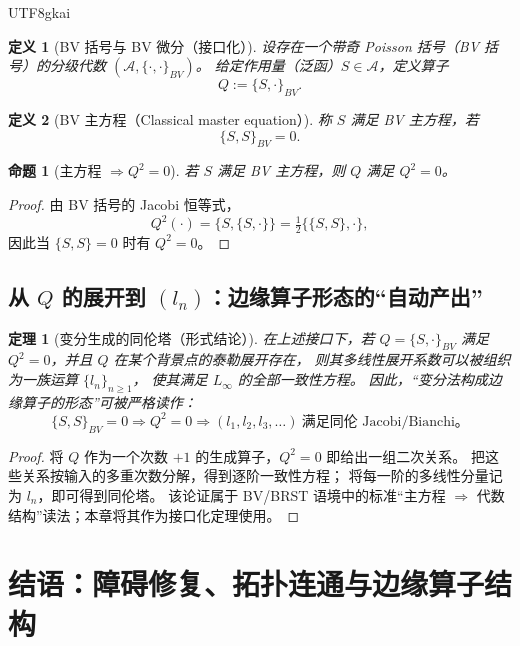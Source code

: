\documentclass[12pt]{article}
\newtheorem{definition}{定义}[section]
\newtheorem{theorem}{定理}[section]
\newtheorem{proposition}{命题}[section]
\begin{document}
\begin{CJK*}{UTF8}{gkai}
\begin{definition}[BV 括号与 BV 微分（接口化）]
设存在一个带奇 Poisson 括号（BV 括号）的分级代数 $(\mathcal{A},\{\cdot,\cdot\}_{BV})$。
给定作用量（泛函）$S\in\mathcal{A}$，定义算子
\[
  Q:=\{S,\cdot\}_{BV}.
\]
\end{definition}

\begin{definition}[BV 主方程（Classical master equation）]
称 $S$ 满足 BV 主方程，若
\[
  \{S,S\}_{BV}=0.
\]
\end{definition}

\begin{proposition}[主方程 $\Rightarrow Q^2=0$]
若 $S$ 满足 BV 主方程，则 $Q$ 满足 $Q^2=0$。
\end{proposition}

\begin{proof}
由 BV 括号的 Jacobi 恒等式，
\[
  Q^2(\cdot)=\{S,\{S,\cdot\}\}
  =\tfrac12\{\{S,S\},\cdot\},
\]
因此当 $\{S,S\}=0$ 时有 $Q^2=0$。
\end{proof}

\subsection{从 $Q$ 的展开到 $(l_n)$：边缘算子形态的“自动产出”}

\begin{theorem}[变分生成的同伦塔（形式结论）]
\label{thm:variational-generates-linfty}
在上述接口下，若 $Q=\{S,\cdot\}_{BV}$ 满足 $Q^2=0$，并且 $Q$ 在某个背景点的泰勒展开存在，
则其多线性展开系数可以被组织为一族运算 $\{l_n\}_{n\ge 1}$，
使其满足 $L_\infty$ 的全部一致性方程。
因此，“变分法构成边缘算子的形态”可被严格读作：
\[
  \{S,S\}_{BV}=0 \Longrightarrow Q^2=0 \Longrightarrow (l_1,l_2,l_3,\dots)\ \text{满足同伦 Jacobi/Bianchi。}
\]
\end{theorem}

\begin{proof}
将 $Q$ 作为一个次数 $+1$ 的生成算子，$Q^2=0$ 即给出一组二次关系。
把这些关系按输入的多重次数分解，得到逐阶一致性方程；
将每一阶的多线性分量记为 $l_n$，即可得到同伦塔。
该论证属于 BV/BRST 语境中的标准“主方程 $\Rightarrow$ 代数结构”读法；本章将其作为接口化定理使用。
\end{proof}

\section{结语：障碍修复、拓扑连通与边缘算子结构}


\end{CJK*}
\end{document}
